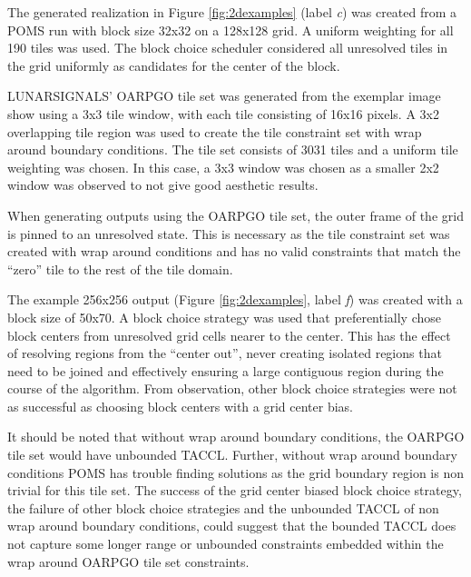The generated realization in Figure \ref{fig:2dexamples} (label \textit{c}) was created from a POMS run with block size 32x32 on a 128x128 grid.
A uniform weighting for all 190 tiles was used.
The block choice scheduler considered all unresolved tiles in the grid uniformly as candidates for the center of the block.

LUNARSIGNALS' OARPGO tile set was generated from the exemplar image show using a 3x3 tile window, with each tile consisting
of 16x16 pixels.
A 3x2 overlapping tile region was used to create the tile constraint set with wrap around boundary conditions.
The tile set consists of 3031 tiles and a uniform tile weighting was chosen.
In this case, a 3x3 window was chosen as a smaller 2x2 window was observed to not give good aesthetic results.

When generating outputs using the OARPGO tile set, the outer frame of the grid is pinned to an unresolved state.
This is necessary as the tile constraint set was created with wrap around conditions and has no valid constraints that match the ``zero'' tile
to the rest of the tile domain.

The example 256x256 output (Figure \ref{fig:2dexamples}, label \textit{f})
was created with a block size of 50x70.
A block choice strategy was used that preferentially chose block centers from unresolved grid cells
nearer to the center.
This has the effect of resolving regions from the ``center out'', never creating isolated regions that need to be joined and effectively
  ensuring a large contiguous region during the course of the algorithm.
From observation, other block choice strategies were not as successful as choosing block centers with a grid center bias.

It should be noted that without wrap around boundary conditions, the OARPGO tile set would have unbounded TACCL.
Further, without wrap around boundary conditions POMS has trouble finding solutions as the
grid boundary region is non trivial for this tile set.
The success of the grid center biased block choice strategy, the failure of other block choice strategies and the unbounded TACCL of
non wrap around boundary conditions, could suggest that the bounded TACCL does not capture some longer range or unbounded constraints
  embedded within the wrap around OARPGO tile set constraints.

